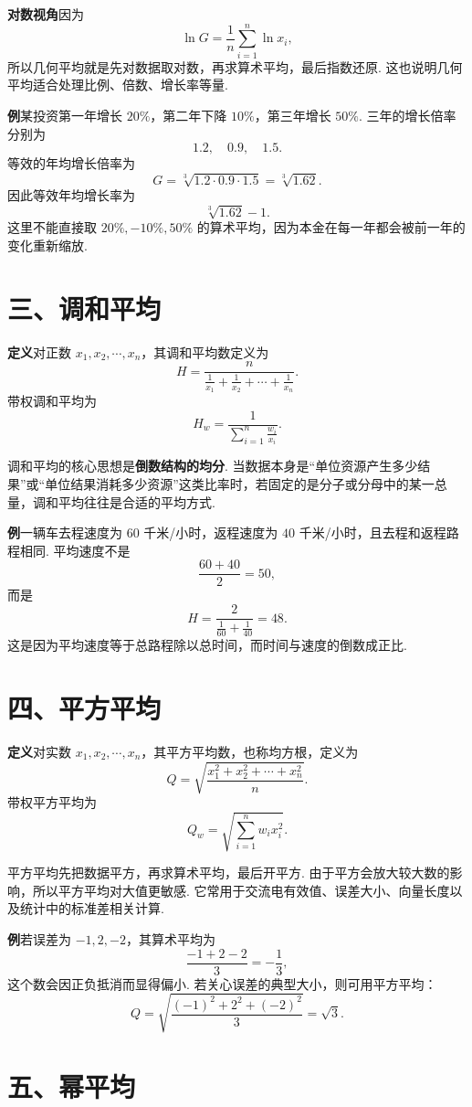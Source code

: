 \documentclass[UTF8, 12pt, fontset=fandol, oneside]{ctexart}
\begin{document}
\noindent\textbf{对数视角}\quad 因为
\[
  \ln G=\frac{1}{n}\sum_{i=1}^n \ln x_i,
\]
所以几何平均就是先对数据取对数，再求算术平均，最后指数还原. 这也说明几何平均适合处理比例、倍数、增长率等量.

\noindent\textbf{例}\quad 某投资第一年增长 $20\%$，第二年下降 $10\%$，第三年增长 $50\%$. 三年的增长倍率分别为
\[
  1.2,\quad 0.9,\quad 1.5.
\]
等效的年均增长倍率为
\[
  G=\sqrt[3]{1.2\cdot0.9\cdot1.5}=\sqrt[3]{1.62}.
\]
因此等效年均增长率为
\[
  \sqrt[3]{1.62}-1.
\]
这里不能直接取 $20\%,-10\%,50\%$ 的算术平均，因为本金在每一年都会被前一年的变化重新缩放.

\section*{三、调和平均}

\noindent\textbf{定义}\quad 对正数 $x_1,x_2,\cdots,x_n$，其调和平均数定义为
\[
  H=\frac{n}{\frac{1}{x_1}+\frac{1}{x_2}+\cdots+\frac{1}{x_n}}.
\]
带权调和平均为
\[
  H_w=\frac{1}{\sum_{i=1}^n \frac{w_i}{x_i}}.
\]

调和平均的核心思想是\textbf{倒数结构的均分}. 当数据本身是``单位资源产生多少结果''或``单位结果消耗多少资源''这类比率时，若固定的是分子或分母中的某一总量，调和平均往往是合适的平均方式.

\noindent\textbf{例}\quad 一辆车去程速度为 $60$ 千米/小时，返程速度为 $40$ 千米/小时，且去程和返程路程相同. 平均速度不是
\[
  \frac{60+40}{2}=50,
\]
而是
\[
  H=\frac{2}{\frac{1}{60}+\frac{1}{40}}=48.
\]
这是因为平均速度等于总路程除以总时间，而时间与速度的倒数成正比.

\section*{四、平方平均}

\noindent\textbf{定义}\quad 对实数 $x_1,x_2,\cdots,x_n$，其平方平均数，也称均方根，定义为
\[
  Q=\sqrt{\frac{x_1^2+x_2^2+\cdots+x_n^2}{n}}.
\]
带权平方平均为
\[
  Q_w=\sqrt{\sum_{i=1}^n w_i x_i^2}.
\]

平方平均先把数据平方，再求算术平均，最后开平方. 由于平方会放大较大数的影响，所以平方平均对大值更敏感. 它常用于交流电有效值、误差大小、向量长度以及统计中的标准差相关计算.

\noindent\textbf{例}\quad 若误差为 $-1,2,-2$，其算术平均为
\[
  \frac{-1+2-2}{3}=-\frac{1}{3},
\]
这个数会因正负抵消而显得偏小. 若关心误差的典型大小，则可用平方平均：
\[
  Q=\sqrt{\frac{(-1)^2+2^2+(-2)^2}{3}}=\sqrt{3}.
\]

\section*{五、幂平均}
\end{document}
